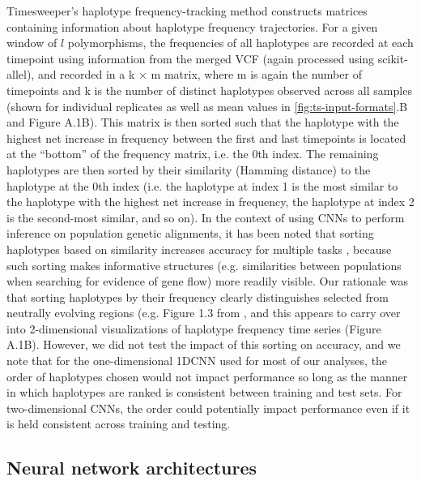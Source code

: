 Timesweeper’s haplotype frequency-tracking method constructs matrices containing information about haplotype frequency trajectories. For a given window of $l$ polymorphisms, the frequencies of all haplotypes are recorded at each timepoint using information from the merged VCF (again processed using scikit-allel), and recorded in a k × m matrix, where m is again the number of timepoints and k is the number of distinct haplotypes observed across all samples (shown for individual replicates as well as mean values in \ref{fig:ts-input-formats}.B and Figure A.1B). This matrix is then sorted such that the haplotype with the highest net increase in frequency between the first and last timepoints is located at the “bottom” of the frequency matrix, i.e. the 0th index. The remaining haplotypes are then sorted by their similarity (Hamming distance) to the haplotype at the 0th index (i.e. the haplotype at index 1 is the most similar to the haplotype with the highest net increase in frequency, the haplotype at index 2 is the second-most similar, and so on). In the context of using CNNs to perform inference on population genetic alignments, it has been noted that sorting haplotypes based on similarity increases accuracy for multiple tasks \cite{flagelUnreasonableEffectivenessConvolutional2019,rayIntroUNETIdentifyingIntrogressed2023}, because such sorting makes informative structures (e.g. similarities between populations when searching for evidence of gene flow) more readily visible. Our rationale was that sorting haplotypes by their frequency clearly distinguishes selected from neutrally evolving regions (e.g. Figure 1.3 from \cite{garudRecentSelectiveSweeps2015}, and this appears to carry over into 2-dimensional visualizations of haplotype frequency time series (Figure A.1B). However, we did not test the impact of this sorting on accuracy, and we note that for the one-dimensional 1DCNN used for most of our analyses, the order of haplotypes chosen would not impact performance so long as the manner in which haplotypes are ranked is consistent between training and test sets. For two-dimensional CNNs, the order could potentially impact performance even if it is held consistent across training and testing. \\

\subsection{Neural network architectures}

